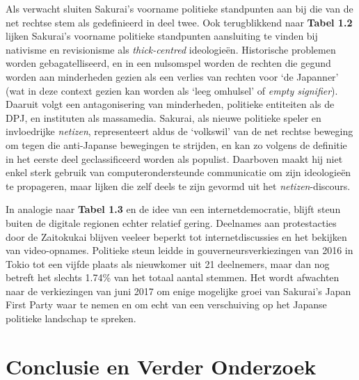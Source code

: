 \documentclass[10.5pt,dutch,]{article}
\begin{document}
Als verwacht sluiten Sakurai's voorname politieke standpunten aan bij
die van de net rechtse stem als gedefinieerd in deel twee. Ook
terugblikkend naar \textbf{Tabel 1.2} lijken Sakurai's voorname
politieke standpunten aansluiting te vinden bij nativisme en
revisionisme als \emph{thick-centred} ideologieën. Historische problemen
worden gebagatelliseerd, en in een nulsomspel worden de rechten die
gegund worden aan minderheden gezien als een verlies van rechten voor
`de Japanner' (wat in deze context gezien kan worden als `leeg omhulsel'
of \emph{empty signifier}). Daaruit volgt een antagonisering van
minderheden, politieke entiteiten als de DPJ, en instituten als
massamedia. Sakurai, als nieuwe politieke speler en invloedrijke
\emph{netizen}, representeert aldus de `volkswil' van de net rechtse
beweging om tegen die anti-Japanse bewegingen te strijden, en kan zo
volgens de definitie in het eerste deel geclassificeerd worden als
populist. Daarboven maakt hij niet enkel sterk gebruik van
computerondersteunde communicatie om zijn ideologieën te propageren,
maar lijken die zelf deels te zijn gevormd uit het
\emph{netizen}-discours.

In analogie naar \textbf{Tabel 1.3} en de idee van een
internetdemocratie, blijft steun buiten de digitale regionen echter
relatief gering. Deelnames aan protestacties door de Zaitokukai blijven
veeleer beperkt tot internetdiscussies en het bekijken van
video-opnames. Politieke steun leidde in gouverneursverkiezingen van
2016 in Tokio tot een vijfde plaats als nieuwkomer uit 21 deelnemers,
maar dan nog betreft het slechts 1.74\% van het totaal aantal stemmen.
Het wordt afwachten naar de verkiezingen van juni 2017 om enige
mogelijke groei van Sakurai's Japan First Party waar te nemen en om echt
van een verschuiving op het Japanse politieke landschap te spreken.

\newpage

\section{Conclusie en Verder
Onderzoek}\label{conclusie-en-verder-onderzoek}
\end{document}
